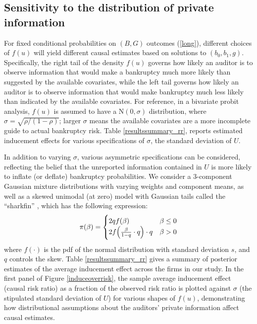 \documentclass[aoas,preprint, 11pt, dvipsnames, table, x11name]{imsart}
\newcommand{\N}{\mbox{N}}
\theoremstyle{remark}
\begin{document}
\subsection{Sensitivity to the distribution of private information}\label{sens_analysis}

For fixed conditional probabilities on $(B, G)$ outcomes  (\ref{long}), different choices of $f(u)$ will yield different causal estimates based on solutions to $(b_0, b_1, g)$. Specifically, the right tail of the density $f(u)$ governs how likely an auditor is to observe information that would make a bankruptcy much more likely than suggested by the available covariates, while the left tail governs how likely an auditor is to observe information that would make bankruptcy much less likely than indicated by the available covariates. For reference, in a bivariate probit analysis, $f(u)$ is assumed to have a $\N(0, \sigma)$ distribution, where $\sigma = \sqrt{\rho/(1-\rho)}$; larger $\sigma$ means the available covariates are a more incomplete guide to actual bankruptcy risk. Table \ref{resultssummary_rr}, reports estimated inducement effects for various specifications of $\sigma$, the standard deviation of $U$.


In addition to varying $\sigma$, various asymmetric specifications can be considered, reflecting the belief that the unreported information contained in $U$ is more likely to inflate (or deflate) bankruptcy probabilities. We consider a 3-component Gaussian mixture distributions with varying weights and component means, as well as a skewed unimodal (at zero) model with Gaussian tails called the ``sharkfin'' \citep{hahnslice}, which has the following expression:
\begin{equation}
	\pi(\beta)=\begin{cases}
		2qf(\beta)&\beta\leq 0\\
		2f\qty(\frac{\beta}{1-q}\cdot q)\cdot q&\beta>0
	\end{cases}
	\label{shark}
\end{equation}
where $f(\cdot)$ is the pdf of the normal distribution with standard deviation $s$, and $q$ controls the skew. Table \ref{resultssummary_rr} gives a summary of posterior estimates of the average inducement effect across the firms in our study.  In the first panel of Figure \ref{induceoverrisk}, the sample average inducement effect (causal risk ratio) as a fraction of the observed risk ratio is plotted against $\sigma$ (the stipulated standard deviation of $U$) for various shapes of $f(u)$, demonstrating how distributional assumptions about the auditors' private information affect causal estimates.
\end{document}
